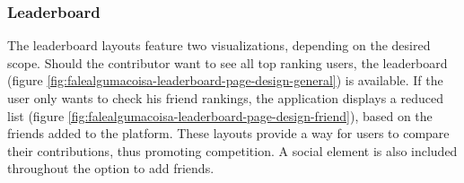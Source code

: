 \subsubsection{Leaderboard}

The leaderboard layouts feature two visualizations, depending on the desired scope. Should the contributor want to see all top ranking users, the leaderboard (figure \ref{fig:falealgumacoisa-leaderboard-page-design-general}) is available. If the user only wants to check his friend rankings, the application displays a reduced list (figure \ref{fig:falealgumacoisa-leaderboard-page-design-friend}), based on the friends added to the platform. These layouts provide a way for users to compare their contributions, thus promoting competition. A social element is also included throughout the option to add friends.

